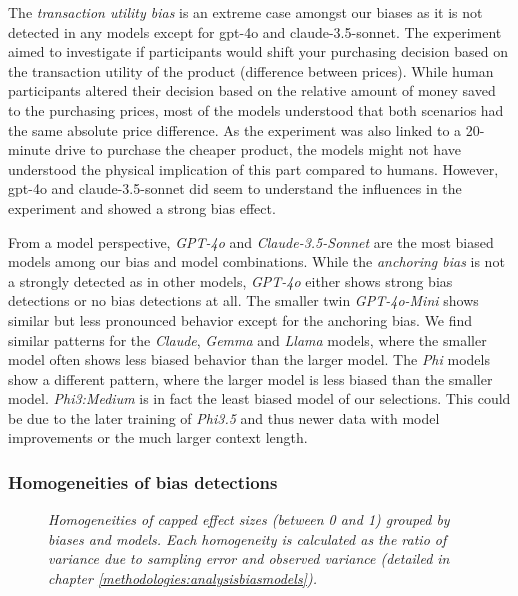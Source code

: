 The \textit{transaction utility bias} is an extreme case amongst our biases as it is not detected in any models except for gpt-4o and claude-3.5-sonnet. The experiment aimed to investigate if participants would shift your purchasing decision based on the transaction utility of the product (difference between prices). While human participants altered their decision based on the relative amount of money saved to the purchasing prices, most of the models understood that both scenarios had the same absolute price difference. As the experiment was also linked to a 20-minute drive to purchase the cheaper product, the models might not have understood the physical implication of this part compared to humans. However, gpt-4o and claude-3.5-sonnet did seem to understand the influences in the experiment and showed a strong bias effect.

\par From a model perspective, \textit{GPT-4o} and \textit{Claude-3.5-Sonnet} are the most biased models among our bias and model combinations. While the \textit{anchoring bias} is not a strongly detected as in other models, \textit{GPT-4o} either shows strong bias detections or no bias detections at all. The smaller twin \textit{GPT-4o-Mini} shows similar but less pronounced behavior except for the anchoring bias. We find similar patterns for the \textit{Claude}, \textit{Gemma} and \textit{Llama} models, where the smaller model often shows less biased behavior than the larger model. The \textit{Phi} models show a different pattern, where the larger model is less biased than the smaller model. \textit{Phi3:Medium} is in fact the least biased model of our selections. This could be due to the later training of \textit{Phi3.5} and thus newer data with model improvements or the much larger context length.


\subsubsection{Homogeneities of bias detections}
\begin{figure}[htbp]
    \centering
    
    \caption[Heatmap of homogeneities grouped by biases and models]{\centering \textit{Homogeneities of capped effect sizes (between 0 and 1) grouped by biases and models. Each homogeneity is calculated as the ratio of variance due to sampling error and observed variance (detailed in chapter \ref{methodologies:analysisbiasmodels}).}}
    \label{fig:homogeneity-heatmap}
\end{figure}

